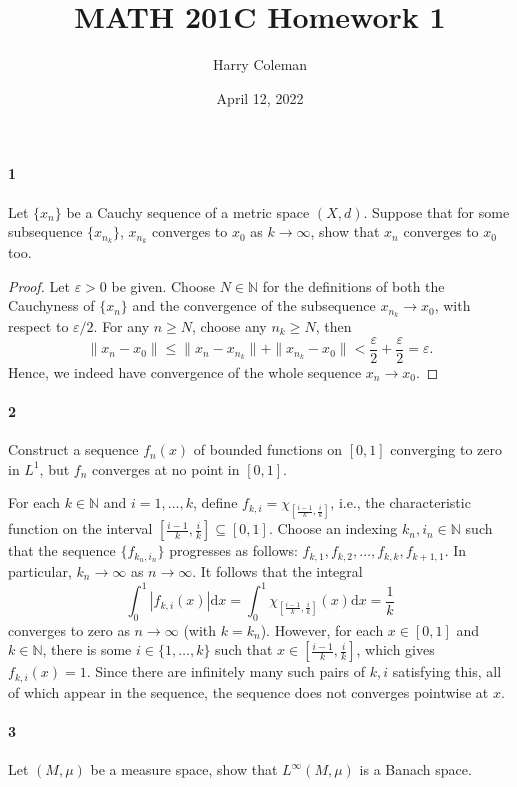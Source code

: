 \documentclass[12pt]{article}
\renewcommand{\maketitle}{\thispagestyle{title}}
\newlength{\myparskip}
\newenvironment{fullbox}{\begin{lrbox}{\savefullbox}\begin{minipage}{\dimexpr\textwidth-2\fboxsep\relax}\setlength{\parskip}{\myparskip}}{\end{minipage}\end{lrbox}\framebox[\textwidth]{\usebox{\savefullbox}}}
\newenvironment{pbox}[1][]{\begin{fullbox}\ifx#1\empty\else\paragraph{#1}\phantom{}\fi}{\end{fullbox}}
\theoremstyle{definition}
\newcommand{\N}{\mathbb{N}}
\newcommand{\eps}{\varepsilon}
\newcommand{\<}{\langle}
\renewcommand{\>}{\rangle}
\newcommand{\seq}{\subseteq}
\newcommand{\dd}{\mathrm{d}}
\begin{document}
\title{MATH 201C Homework 1}
\author{Harry Coleman}
\date{April 12, 2022}
\maketitle


\begin{pbox}[1]
    Let $\{x_n\}$ be a Cauchy sequence of a metric space $(X, d)$.
    Suppose that for some subsequence $\{x_{n_k}\}$, $x_{n_k}$ converges to $x_0$ as $k \to \infty$, show that $x_n$ converges to $x_0$ too.
\end{pbox}

\begin{proof}
    Let $\eps > 0$ be given.
    Choose $N \in \N$ for the definitions of both the Cauchyness of $\{x_n\}$ and the convergence of the subsequence $x_{n_k} \to x_0$, with respect to $\eps/2$.
    For any $n \geq N$, choose any $n_k \geq N$, then
    \[
        \|x_n - x_0\|
            \leq \|x_n - x_{n_k}\| + \|x_{n_k} - x_0\|
            < \frac{\eps}{2} + \frac{\eps}{2}
            = \eps.
    \]
    Hence, we indeed have convergence of the whole sequence $x_n \to x_0$.
\end{proof}


\newpage
\begin{pbox}[2]
    Construct a sequence $f_n(x)$ of bounded functions on $[0, 1]$ converging to zero in $L^1$, but $f_n$ converges at no point in $[0, 1]$.
\end{pbox}

For each $k \in \N$ and $i = 1, \dots, k$, define $f_{k, i} = \chi_{[\frac{i-1}{k}, \frac{i}{k}]}$, i.e., the characteristic function on the interval $[\frac{i-1}{k}, \frac{i}{k}] \seq [0, 1]$.
Choose an indexing $k_n, i_n \in \N$ such that the sequence $\{f_{k_n, i_n}\}$ progresses as follows: $f_{k,1}, f_{k,2}, \dots, f_{k,k}, f_{k+1, 1}$.
In particular, $k_n \to \infty$ as $n \to \infty$.
It follows that the integral
\[
    \int_{0}^{1} |f_{k,i}(x)| \dd{x}
        = \int_{0}^{1} \chi_{[\frac{i-1}{k}, \frac{i}{k}]}(x) \dd{x}
        = \frac{1}{k}
\]
converges to zero as $n \to \infty$ (with $k = k_n$).
However, for each $x \in [0, 1]$ and $k \in \N$, there is some $i \in \{1, \dots, k\}$ such that $x \in [\frac{i-1}{k}, \frac{i}{k}]$, which gives $f_{k,i}(x) = 1$.
Since there are infinitely many such pairs of $k, i$ satisfying this, all of which appear in the sequence, the sequence does not converges pointwise at $x$.


\newpage
\begin{pbox}[3]
    Let $(M, \mu)$ be a measure space, show that $L^\infty(M, \mu)$ is a Banach space.
\end{pbox}
\end{document}
